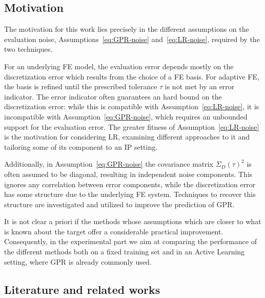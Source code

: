 \subsection{Motivation}\label{sec:motivation}

The motivation for this work lies precisely in the different assumptions on the evaluation noise, Assumptions~\ref{eq:GPR-noise} and~\ref{eq:LR-noise}, required by the two techniques.

For an underlying FE model, the evaluation error depends mostly on the discretization error which results from the choice of a FE basis.
For adaptive FE, the basis is refined until the prescribed tolerance $\tau$ is not met by an error indicator.
The error indicator often guarantees an hard bound on the discretization error: while this is compatible with Assumption~\ref{eq:LR-noise}, it is incompatible with Assumption~\ref{eq:GPR-noise}, which requires an unbounded support for the evaluation error. 
The greater fitness of Assumption~\ref{eq:LR-noise} is the motivation for considering LR, examining different approaches to it and tailoring some of its component to an IP setting.

Additionally, in Assumption~\ref{eq:GPR-noise} the covariance matrix $\Sigma_D(\tau)^2$ is often assumed to be diagonal, resulting in independent noise components. 
This ignores any correlation between error components, while the discretization error has some structure due to the underlying FE system.
Techniques to recover this structure are investigated and utilized to improve the prediction of GPR.

It is not clear a priori if the methods whose assumptions which are closer to what is known about the target offer a considerable practical improvement.
Consequently, in the experimental part we aim at comparing the performance of the different methods both on a fixed training set and in an Active Learning setting, where GPR is already commonly used. 


\subsection{Literature and related works}\label{sec:literature}

